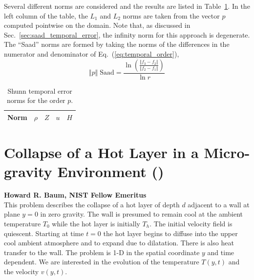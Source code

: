 \documentclass[11pt]{book}
\begin{document}
Several different norms are considered and the results are listed in Table~\ref{tab:shunn_terr_norms}.  In the left column of the table, the $L_1$ and $L_2$ norms are taken from the vector $p$ computed pointwise on the domain.  Note that, as discussed in Sec.~\ref{sec:saad_temporal_error}, the infinity norm for this approach is degenerate.  The ``Saad'' norms are formed by taking the norms of the differences in the numerator and denominator of Eq.~(\ref{eq:temporal_order}),
\begin{equation}
\Vert p \Vert \; \mbox{Saad} = \frac{ \ln \left( \frac{\Vert f_3-f_2 \Vert}{\Vert f_2-f_1 \Vert} \right) }{\ln r}
\end{equation}

\begin{table}[ht]
\centering
\caption[Shunn temporal error norms]{Shunn temporal error norms for the order $p$.}
\begin{tabular}{lcccc}
Norm & $\rho$ & $Z$ & $u$ & $H$ \\
\hline

\end{tabular}
\label{tab:shunn_terr_norms}
\end{table}



\section{Collapse of a Hot Layer in a Micro-gravity Environment (\texorpdfstring{}{hot\_layer\_360})}
\label{sec:baum_hot_layer}

\textbf{Howard R. Baum, NIST Fellow Emeritus}\\

\noindent This problem describes the collapse of a hot layer of depth $d$ adjacent to a wall at plane $y=0$ in zero gravity.  The wall is presumed to remain cool at the ambient temperature $T_0$ while the hot layer is initially $T_h$.  The initial velocity field is quiescent.  Starting at time $t=0$ the hot layer begins to diffuse into the upper cool ambient atmosphere and to expand due to dilatation.  There is also heat transfer to the wall.  The problem is 1-D in the spatial coordinate $y$ and time dependent.  We are interested in the evolution of the temperature $T(y,t)$ and the velocity $v(y,t)$.
\end{document}
